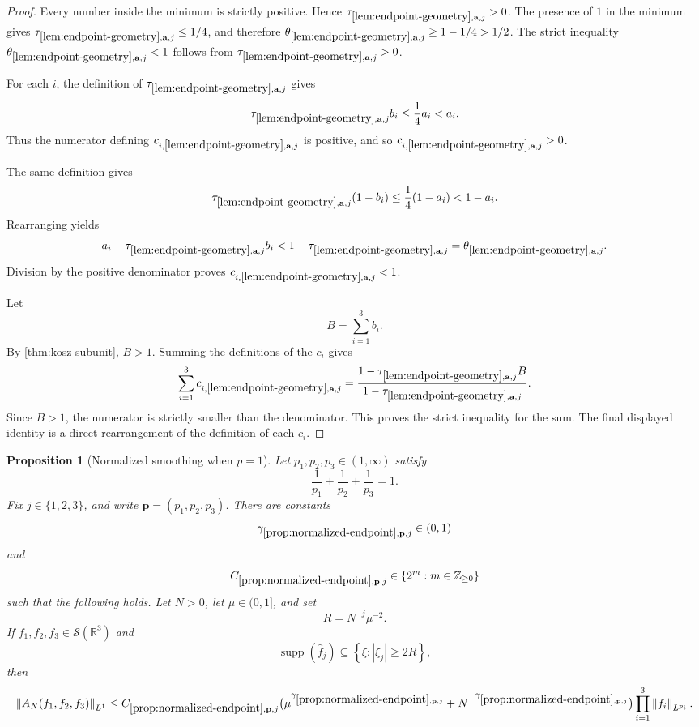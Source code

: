 \documentclass[11pt]{article}
\newtheorem{proposition}[theorem]{Proposition}
\newcommand{\R}{\mathbb{R}}
\newcommand{\Sch}{\mathcal{S}}
\newcommand{\supp}{\operatorname{supp}}
\newcommand{\norm}[2]{\left\lVert #1\right\rVert_{#2}}
\newcommand{\Cst}[2]{C_{\ref{#1},#2}}
\newcommand{\Gam}[2]{\gamma_{\ref{#1},#2}}
\newcommand{\abs}[1]{\left|#1\right|}
\newcommand{\set}[1]{\left\{#1\right\}}
\newcommand{\indices}{\{1,2,3\}}
\begin{document}
	\begin{proof}
		Every number inside the minimum is strictly positive.  Hence \(\tau_{\ref{lem:endpoint-geometry},\mathbf a,j}>0\).  The presence of \(1\) in the minimum gives \(\tau_{\ref{lem:endpoint-geometry},\mathbf a,j}\leq1/4\), and therefore \(\theta_{\ref{lem:endpoint-geometry},\mathbf a,j}\geq1-1/4>1/2\).  The strict inequality \(\theta_{\ref{lem:endpoint-geometry},\mathbf a,j}<1\) follows from \(\tau_{\ref{lem:endpoint-geometry},\mathbf a,j}>0\).
		
		For each \(i\), the definition of \(\tau_{\ref{lem:endpoint-geometry},\mathbf a,j}\) gives
		\[
		\tau_{\ref{lem:endpoint-geometry},\mathbf a,j}b_i
		\leq
		\frac14 a_i<a_i.
		\]
		Thus the numerator defining \(c_{i,\ref{lem:endpoint-geometry},\mathbf a,j}\) is positive, and so \(c_{i,\ref{lem:endpoint-geometry},\mathbf a,j}>0\).
		
		The same definition gives
		\[
		\tau_{\ref{lem:endpoint-geometry},\mathbf a,j}(1-b_i)
		\leq
		\frac14(1-a_i)<1-a_i.
		\]
		Rearranging yields
		\[
		a_i-\tau_{\ref{lem:endpoint-geometry},\mathbf a,j}b_i
		<
		1-\tau_{\ref{lem:endpoint-geometry},\mathbf a,j}
		=
		\theta_{\ref{lem:endpoint-geometry},\mathbf a,j}.
		\]
		Division by the positive denominator proves \(c_{i,\ref{lem:endpoint-geometry},\mathbf a,j}<1\).
		
		Let
		\[
		B=\sum_{i=1}^{3}b_i.
		\]
		By \cref{thm:kosz-subunit}, \(B>1\).  Summing the definitions of the \(c_i\) gives
		\[
		\sum_{i=1}^{3}c_{i,\ref{lem:endpoint-geometry},\mathbf a,j}
		=
		\frac{1-\tau_{\ref{lem:endpoint-geometry},\mathbf a,j}B}
		{1-\tau_{\ref{lem:endpoint-geometry},\mathbf a,j}}.
		\]
		Since \(B>1\), the numerator is strictly smaller than the denominator.  This proves the strict inequality for the sum.  The final displayed identity is a direct rearrangement of the definition of each \(c_i\).
	\end{proof}
	
	\begin{proposition}[Normalized smoothing when \(p=1\)]\label{prop:normalized-endpoint}
		Let \(p_1,p_2,p_3\in(1,\infty)\) satisfy
		\[
		\frac1{p_1}+\frac1{p_2}+\frac1{p_3}=1.
		\]
		Fix \(j\in\indices\), and write \(\mathbf p=(p_1,p_2,p_3)\).  There are constants
		\[
		\Gam{prop:normalized-endpoint}{\mathbf p,j}\in(0,1)
		\]
		and
		\[
		\Cst{prop:normalized-endpoint}{\mathbf p,j}\in\set{2^m:m\in\mathbb Z_{\geq0}}
		\]
		such that the following holds.  Let \(N>0\), let \(\mu\in(0,1]\), and set
		\[
		R=N^{-j}\mu^{-2}.
		\]
		If \(f_1,f_2,f_3\in\Sch(\R^3)\) and
		\[
		\supp(\widehat f_j)\subseteq\set{\xi:\abs{\xi_j}\geq2R},
		\]
		then
		\[
		\norm{A_N(f_1,f_2,f_3)}{L^1}
		\leq
		\Cst{prop:normalized-endpoint}{\mathbf p,j}
		\bigl(\mu^{\Gam{prop:normalized-endpoint}{\mathbf p,j}}
		+N^{-\Gam{prop:normalized-endpoint}{\mathbf p,j}}\bigr)
		\prod_{i=1}^{3}\norm{f_i}{L^{p_i}}.
		\]
	\end{proposition}
	
\end{document}
